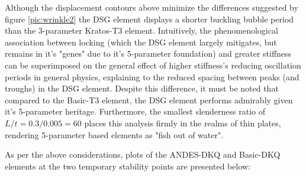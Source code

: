 Although the displacement contours above minimize the differences suggested by figure \ref{pic:wrinkle2} the DSG element displays a shorter buckling bubble period than the 3-parameter Kratos-T3 element. Intuitively, the phenomenological association between locking (which the DSG element largely mitigates, but remains in it's "genes" due to it's 5-parameter foundation) and greater stiffness can be superimposed on the general effect of higher stiffness's reducing oscillation periods in general physics, explaining to the reduced spacing between peaks (and troughs) in the DSG element. Despite this difference, it must be noted that compared to the Basic-T3 element, the DSG element performs admirably given it's 5-parameter heritage. Furthermore, the smallest slenderness ratio of $L/t = 0.3/0.005 = 60$ places this analysis firmly in the realms of thin plates, rendering 5-parameter based elements as "fish out of water".

As per the above considerations, plots of the ANDES-DKQ and Basic-DKQ elements at the two temporary stability points are presented below:

